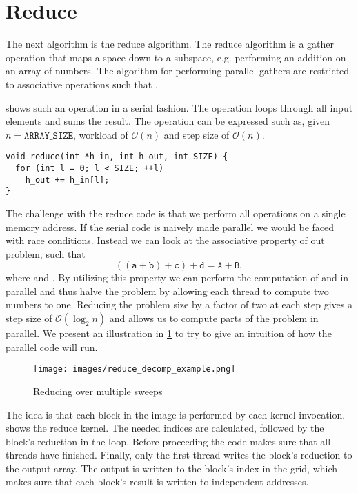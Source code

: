 \section{Reduce}
\label{sec:reduce}

The next algorithm is the reduce algorithm.
The reduce algorithm is a gather operation that maps a space down to a subspace, e.g. performing an addition on an array of numbers.
The algorithm for performing parallel gathers are restricted to associative operations such that .

 shows such an operation in a serial fashion.
The operation loops through all input elements and sums the result.
The operation can be expressed such as, given $n=\mathtt{ARRAY\_SIZE}$, workload of $\mathcal{O}(n)$ and step size of $\mathcal{O}(n)$.

\begin{lstlisting}[caption={Serial reduce}, label={lst:reduce seq}]
void reduce(int *h_in, int h_out, int SIZE) {
  for (int l = 0; l < SIZE; ++l) 
    h_out += h_in[l];
}
\end{lstlisting}

The challenge with the reduce code is that we perform all operations on a single memory address.
If the serial code is naively made parallel we would be faced with race conditions.
Instead we can look at the associative property of out problem, such that 
\[
  \mathtt{((a+b)+c)+d = A + B},
\]
where  and .
By utilizing this property we can perform the computation of  and  in parallel and thus halve the problem by allowing each thread to compute two numbers to one.
Reducing the problem size by a factor of two at each step gives a step size of $\mathcal{O}(\log_2 n)$ and allows us to compute parts of the problem in parallel.
We present an illustration in \cref{fig:reduce decomp example} to try to give an intuition of how the parallel code will run.~\cite{reduceharris}

\begin{figure}[htb]
  \centering
  \texttt{[image: images/reduce\_decomp\_example.png]}
  \caption{Reducing over multiple sweeps}
  \label{fig:reduce decomp example}
\end{figure}

The idea is that each block in the image is performed by each kernel invocation.
 shows the reduce kernel.
The needed indices are calculated, followed by the block's reduction in the loop.
Before proceeding the code makes sure that all threads have finished.
Finally, only the first thread writes the block's reduction to the output array.
The output is written to the block's index in the grid, which makes sure that each block's result is written to independent addresses.

